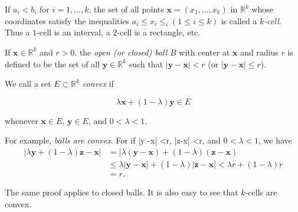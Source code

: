 If $a_i <b_i$ for $i=1,...,k$, the set of all points $\mathbf{x} =(x_1, ..., x_k)$ in $\mathbb{R}^k$ whose coordinates satisfy the inequalities $a_i \leq x_i \leq _i (1 \leq i \leq k)$ is called a \emph{$k$-cell}.\\
Thus a $1$-cell is an interval, a $2$-cell is a rectangle, etc.

If $\mathbf{x}\in \mathbb{R}^k$ and $r > 0$. the \emph{open (or closed) ball} $B$ with center at $\mathbf{x}$ and radius $r$ is defined to be the set of all $\mathbf{y} \in \mathbb{R}^k$ such that $|\mathbf{y} - \mathbf{x}| <r$ (or $|\mathbf{y} - \mathbf{x}| \leq r$).

We call a set $E \subset \mathbb{R}^k$ \emph{convex} if

\begin{equation*}
    \lambda\mathbf{x} + (1 - \lambda)\mathbf{y} \in E
\end{equation*}

whenever $\mathbf{x} \in E$, $\mathbf{y} \in E$, and $0 < \lambda < 1$.

For example, \emph{balls are convex}. For if |y -x| <r, |z-x| <r, and
$0 < \lambda <1$, we have
\begin{align*}
    |\lambda \mathbf{y} + (1-\lambda) \mathbf{z} - \mathbf{x}|
    & = |\lambda (\mathbf{y} - \mathbf{x}) + (1 - \lambda)(\mathbf{z} - \mathbf{x})\\
    & \leq \lambda |\mathbf{y} - \mathbf{x}| + (1 - \lambda)|\mathbf{z} - \mathbf{x}| < \lambda r + (1 - \lambda)r\\
    & = r.
\end{align*}


The same proof applies to closed balls. It is also easy to see that $k$-cells are convex.

